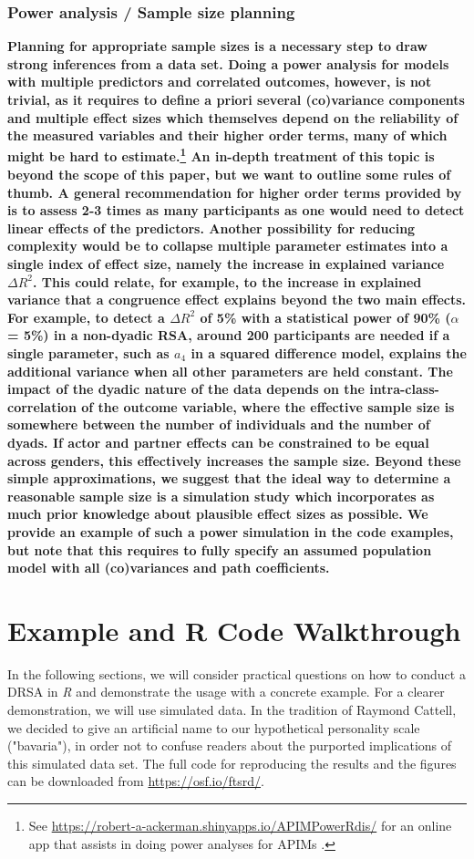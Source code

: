 \documentclass[jou,a4paper,draftfirst]{apa6}
\newcommand{\added}[1]{\textcolor{colour_added}{\bf{#1}}}
\begin{document}
\subsubsection{Power analysis / Sample size planning}
\added{Planning for appropriate sample sizes is a necessary step to draw strong inferences from a data set. Doing a power analysis for models with multiple predictors and correlated outcomes, however, is not trivial, as it requires to define a priori several (co)variance components and multiple effect sizes which themselves depend on the reliability of the measured variables and their higher order terms, many of which might be hard to estimate.\footnote{See \url{https://robert-a-ackerman.shinyapps.io/APIMPowerRdis/} for an online app that assists in doing power analyses for APIMs \parencite{Ackerman_Kenny_2016}.} An in-depth treatment of this topic is beyond the scope of this paper, but we want to outline some rules of thumb. A general recommendation for higher order terms provided by \textcite{Aiken_West_1991} is to assess 2-3 times as many participants as one would need to detect linear effects of the predictors. Another possibility for reducing complexity would be to collapse multiple parameter estimates into a single index of effect size, namely the increase in explained variance $\Delta R^2$. This could relate, for example, to the increase in explained variance that a congruence effect explains beyond the two main effects. For example, to detect a $\Delta R^2$ of 5\% with a statistical power of 90\% ($\alpha$ = 5\%) in a non-dyadic RSA, around 200 participants are needed if a single parameter, such as $a_4$ in a squared difference model, explains the additional variance when all other parameters are held constant. The impact of the dyadic nature of the data depends on the intra-class-correlation of the outcome variable, where the effective sample size is somewhere between the number of individuals and the number of dyads. If actor and partner effects can be constrained to be equal across genders, this effectively increases the sample size. Beyond these simple approximations, we suggest that the ideal way to determine a reasonable sample size is a simulation study \parencite{NestlerEtAl2015} which incorporates as much prior knowledge about plausible effect sizes as possible. We provide an example of such a power simulation in the code examples, but note that this requires to fully specify an assumed population model with all (co)variances and path coefficients.}

\section{Example and R Code Walkthrough} 
In the following sections, we will consider practical questions on how to conduct a DRSA in \textit{R} and demonstrate the usage with a concrete example. For a clearer demonstration, we will use simulated data. In the tradition of Raymond Cattell, we decided to give an artificial name to our hypothetical personality scale ("bavaria"), in order not to confuse readers about the purported implications of this simulated data set. The full code for reproducing the results and the figures can be downloaded from \url{https://osf.io/ftsrd/}.
\end{document}
